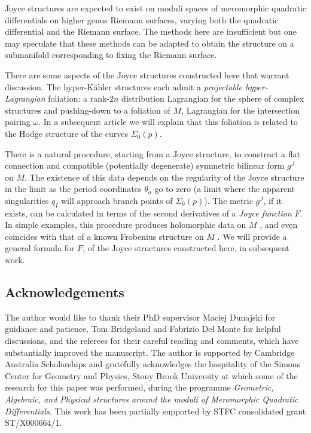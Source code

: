 \documentclass[a4paper,12pt,reqno]{amsart}
\numberwithin{equation}{section}
\numberwithin{counter2}{section}
\begin{document}
 Joyce structures are expected to exist on moduli spaces of meromorphic quadratic differentials on higher genus Riemann surfaces,  varying both the quadratic differential and the Riemann surface.  The methods here are insufficient but one may speculate that these methods can be adapted to obtain the structure on a submanifold corresponding to fixing the Riemann surface.  \par
 There are some aspects of the Joyce structures constructed here that warrant discussion.  The hyper-K\"ahler structures each admit a \textit{projectable hyper-Lagrangian} foliation: a rank-$2n$ distribution Lagrangian for the sphere of complex structures and pushing-down to a foliation of $M$,  Lagrangian for the intersection pairing $\omega$.  In a subsequent article we will explain that this foliation is related to the Hodge structure of the curves $\Sigma_0(p)$. \par
There is a natural procedure,  starting from a Joyce structure,  to construct a flat connection and compatible (potentially degenerate) symmetric bilinear form $g^J$ on $M$.  The existence of this data depends on the regularity of the Joyce structure in the limit as the period coordinates $\theta_a$ go to zero (a limit where the apparent singularities $q_I$ will approach branch points of $\Sigma_0(p)$).  The metric $g^J$,  if it exists,  can be calculated in terms of the second derivatives of a \textit{Joyce function} $F$.  In simple examples,  this procedure produces holomorphic data on $M$ \cite{BdM},  and even coincides with that of a known Frobenius structure on $M$ \cite{BM}.  We will provide a general formula for $F$,  of the Joyce structures constructed here,  in subsequent work.  
 \subsection*{Acknowledgements}
The author would like to thank their PhD supervisor Maciej Dunajski for guidance and patience,  Tom Bridgeland and Fabrizio Del Monte for helpful discussions,  and the referees for their careful reading and comments,  which have substantially improved the manuscript.  The author is supported by Cambridge Australia Scholarships and gratefully acknowledges the hospitality of the Simons Center for Geometry and Physics,  Stony Brook University at which some of the research for this paper was performed,  during the programme \textit{Geometric, Algebraic, and Physical structures around the moduli of Meromorphic Quadratic Differentials}. This work has been partially supported by STFC consolidated grant ST/X000664/1.\par 
\end{document}
